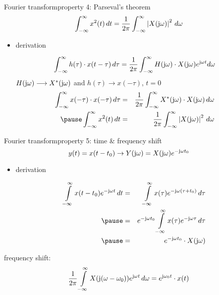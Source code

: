 	\begin{frame}{Fourier transform}{property 4: Parseval's theorem}
		\begin{equation*}
			\int_{-\infty}^{\infty}{x^2(t)\, dt} = \frac{1}{2\pi}\int_{-\infty}^{\infty} {\left|X(\mathrm{j}\omega)\right|^2\, d\omega} 
		\end{equation*}
		\pause
		\begin{itemize}
			\item[]	derivation
			\begin{footnotesize}
				\begin{equation*}
					\int_{-\infty}^{\infty}{h(\tau)\cdot x(t-\tau)\, d\tau} = \frac{1}{2\pi}\int_{-\infty}^{\infty} {H(\mathrm{j}\omega)\cdot X(\mathrm{j}\omega) {e}^{\mathrm{j}\omega t} d\omega}\nonumber
				\end{equation*}
				 \centering $H(\mathrm{j}\omega) \longrightarrow X^\ast (\mathrm{j}\omega)$ and $h(\tau)\longrightarrow x(-\tau)$, $t = 0$
							\pause
				\begin{eqnarray*}
					\int_{-\infty}^{\infty}{x(-\tau)\cdot x(-\tau)\, d\tau} &=& \frac{1}{2\pi}\int_{-\infty}^{\infty} {X^\ast (\jom)\cdot X(\jom) \, d\omega}\nonumber\\
					\pause
					\int_{-\infty}^{\infty}{x^2(t)\, dt} &=& \frac{1}{2\pi}\int_{-\infty}^{\infty} {\left|X(\jom)\right|^2\, d\omega} \nonumber
				\end{eqnarray*}
			\end{footnotesize}
		\end{itemize}
	\end{frame}	

	\begin{frame}{Fourier transform}{property 5: time \& frequency shift}
		\begin{equation*}\label{eq:fft_timeshift}
			y(t) = x(t-t_0)\rightarrow Y(\mathrm{j}\omega) = X(\mathrm{j}\omega){e}^{-\mathrm{j}\omega t_0} 
		\end{equation*} 
		\pause
		\begin{itemize}
			\item[]	derivation
			\begin{footnotesize}
				\begin{eqnarray*}
					\int\limits_{-\infty}^{\infty} {x(t-t_0) \e^{-\jom t}\, dt} &=& \int\limits_{-\infty}^{\infty} {x(\tau) \e^{-\jom (\tau + t_0)}\, d\tau}\nonumber\\
					\pause
					&=& \e^{-\jom t_0}\int\limits_{-\infty}^{\infty} {x(\tau) \e^{-\jom \tau}\, d\tau}\nonumber\\
					\pause
					&=& \e^{-\jom t_0} \cdot X(\jom) \nonumber
				\end{eqnarray*}
			\end{footnotesize}
		\end{itemize}
		\pause
		frequency shift:
		\begin{equation*}
					\frac{1}{2\pi}\int\limits_{-\infty}^{\infty} X(\mathrm{j}(\omega-\omega_0)) {e}^{\mathrm{j}\omega t}\, d\omega = {e}^{\mathrm{j}\omega_0 t}\cdot x(t) 		
		\end{equation*} 

	\end{frame}	

